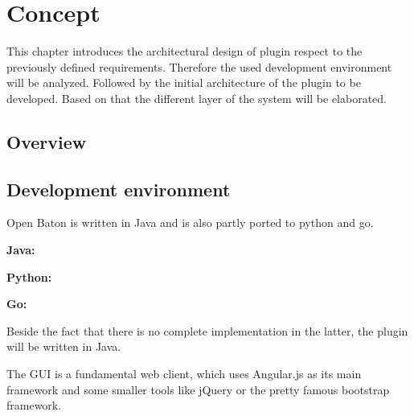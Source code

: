 \acresetall

\chapter{Concept}\label{chapter:concept}
This chapter introduces the architectural design of plugin respect to the previously defined requirements.
Therefore the used development environment will be analyzed.
Followed by the initial architecture of the plugin to be developed.
Based on that the different layer of the system will be elaborated.

\section{Overview}
\doit


\section{Development environment}
\doit

Open Baton is written in Java and is also partly ported to python and go.

\textbf{Java:}

\textbf{Python:}

\textbf{Go:}

Beside the fact that there is no complete implementation in the latter, the plugin will be written in Java.

The \ac{GUI} is a fundamental web client, which uses Angular.js as its main framework and some smaller tools like jQuery or the pretty famous bootstrap framework.



